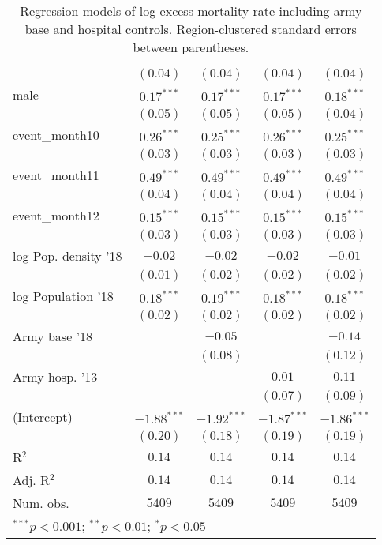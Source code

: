 \begin{table}
\begin{center}
\begin{tabular}{l c c c c}
                     & $(0.04)$      & $(0.04)$      & $(0.04)$      & $(0.04)$      \\
male                 & $0.17^{***}$  & $0.17^{***}$  & $0.17^{***}$  & $0.18^{***}$  \\
                     & $(0.05)$      & $(0.05)$      & $(0.05)$      & $(0.04)$      \\
event\_month10       & $0.26^{***}$  & $0.25^{***}$  & $0.26^{***}$  & $0.25^{***}$  \\
                     & $(0.03)$      & $(0.03)$      & $(0.03)$      & $(0.03)$      \\
event\_month11       & $0.49^{***}$  & $0.49^{***}$  & $0.49^{***}$  & $0.49^{***}$  \\
                     & $(0.04)$      & $(0.04)$      & $(0.04)$      & $(0.04)$      \\
event\_month12       & $0.15^{***}$  & $0.15^{***}$  & $0.15^{***}$  & $0.15^{***}$  \\
                     & $(0.03)$      & $(0.03)$      & $(0.03)$      & $(0.03)$      \\
log Pop. density '18 & $-0.02$       & $-0.02$       & $-0.02$       & $-0.01$       \\
                     & $(0.01)$      & $(0.02)$      & $(0.02)$      & $(0.02)$      \\
log Population '18   & $0.18^{***}$  & $0.19^{***}$  & $0.18^{***}$  & $0.18^{***}$  \\
                     & $(0.02)$      & $(0.02)$      & $(0.02)$      & $(0.02)$      \\
Army base '18        &               & $-0.05$       &               & $-0.14$       \\
                     &               & $(0.08)$      &               & $(0.12)$      \\
Army hosp. '13       &               &               & $0.01$        & $0.11$        \\
                     &               &               & $(0.07)$      & $(0.09)$      \\
(Intercept)          & $-1.88^{***}$ & $-1.92^{***}$ & $-1.87^{***}$ & $-1.86^{***}$ \\
                     & $(0.20)$      & $(0.18)$      & $(0.19)$      & $(0.19)$      \\
\hline
R$^2$                & $0.14$        & $0.14$        & $0.14$        & $0.14$        \\
Adj. R$^2$           & $0.14$        & $0.14$        & $0.14$        & $0.14$        \\
Num. obs.            & $5409$        & $5409$        & $5409$        & $5409$        \\
\hline
\multicolumn{5}{l}{\scriptsize{$^{***}p<0.001$; $^{**}p<0.01$; $^{*}p<0.05$}}
\end{tabular}
\caption{Regression models of log excess mortality rate including army base and hospital controls. Region-clustered standard errors between parentheses.}
\label{tab:popdensmodels}
\end{center}
\end{table}
